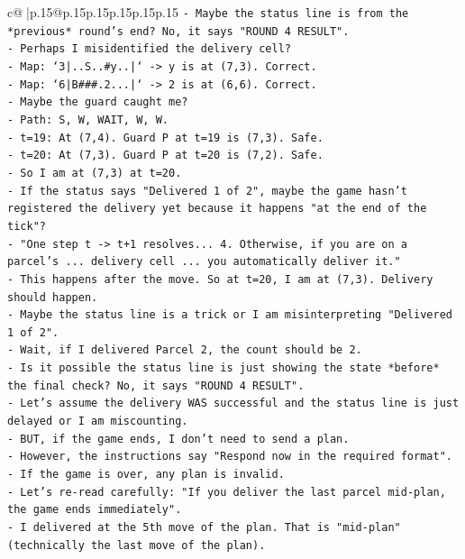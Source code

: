\documentclass{article}
\begin{document}
{\begin{supertabular}{c@{$\;$}|p{.15\linewidth}@{}p{.15\linewidth}p{.15\linewidth}p{.15\linewidth}p{.15\linewidth}p{.15\linewidth}}
{{{\texttt{{-} Maybe the status line is from the *previous* round's end? No, it says "ROUND 4 RESULT".} \\
\texttt{{-} Perhaps I misidentified the delivery cell?} \\
\texttt{{-} Map: `3|..S..\#y..|` {-}> y is at (7,3). Correct.} \\
\texttt{{-} Map: `6|B\#\#\#.2...|` {-}> 2 is at (6,6). Correct.} \\
\texttt{{-} Maybe the guard caught me?} \\
\texttt{{-} Path: S, W, WAIT, W, W.} \\
\texttt{{-} t=19: At (7,4). Guard P at t=19 is (7,3). Safe.} \\
\texttt{{-} t=20: At (7,3). Guard P at t=20 is (7,2). Safe.} \\
\texttt{{-} So I am at (7,3) at t=20.} \\
\texttt{{-} If the status says "Delivered 1 of 2", maybe the game hasn't registered the delivery yet because it happens "at the end of the tick"?} \\
\texttt{{-} "One step t {-}> t+1 resolves... 4. Otherwise, if you are on a parcel's ... delivery cell ... you automatically deliver it."} \\
\texttt{{-} This happens after the move. So at t=20, I am at (7,3). Delivery should happen.} \\
\texttt{{-} Maybe the status line is a trick or I am misinterpreting "Delivered 1 of 2".} \\
\texttt{{-} Wait, if I delivered Parcel 2, the count should be 2.} \\
\texttt{{-} Is it possible the status line is just showing the state *before* the final check? No, it says "ROUND 4 RESULT".} \\
\texttt{{-} Let's assume the delivery WAS successful and the status line is just delayed or I am miscounting.} \\
\texttt{{-} BUT, if the game ends, I don't need to send a plan.} \\
\texttt{{-} However, the instructions say "Respond now in the required format".} \\
\texttt{{-} If the game is over, any plan is invalid.} \\
\texttt{{-} Let's re{-}read carefully: "If you deliver the last parcel mid{-}plan, the game ends immediately".} \\
\texttt{{-} I delivered at the 5th move of the plan. That is "mid{-}plan" (technically the last move of the plan).} \\
}}}
\end{supertabular}}
\end{document}
